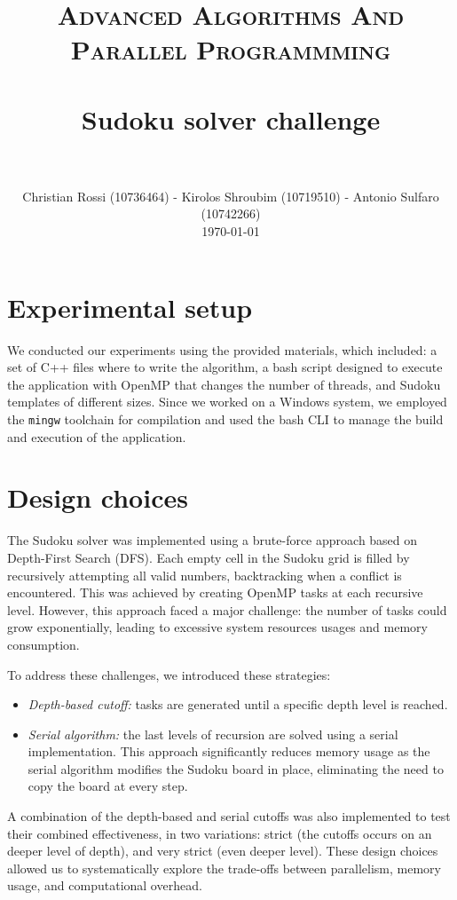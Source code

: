 \documentclass[paper=a4, fontsize=12pt]{scrartcl}
\title{
		\vspace{-1in} 	
		\usefont{OT1}{bch}{b}{n}
		\normalfont \normalsize \textsc{Advanced Algorithms And Parallel Programmming} \\ [25pt]
		\horrule{0.5pt} \\[0.4cm]
		\huge Sudoku solver challenge \\
		\horrule{2pt} \\[0.5cm]
}
\author{
		\normalfont 								\normalsize
        Christian Rossi (10736464) - Kirolos Shroubim (10719510) - Antonio Sulfaro (10742266)\\[-3pt]		\normalsize
        \today
}
\date{}
\numberwithin{equation}{section}
\numberwithin{figure}{section}
\numberwithin{table}{section}
\begin{document}
    \maketitle

    \section{Experimental setup}
    We conducted our experiments using the provided materials, which included: a set of C++ files where to write the algorithm, a bash script designed to execute the application with OpenMP that changes the number of threads, and Sudoku templates of different sizes. 
    Since we worked on a Windows system, we employed the \texttt{mingw} toolchain for compilation and used the bash CLI to manage the build and execution of the application.
    
    \section{Design choices}
    The Sudoku solver was implemented using a brute-force approach based on Depth-First Search (DFS). 
    Each empty cell in the Sudoku grid is filled by recursively attempting all valid numbers, backtracking when a conflict is encountered.
    This was achieved by creating OpenMP tasks at each recursive level. 
    However, this approach faced a major challenge: the number of tasks could grow exponentially, leading to excessive system resources usages and memory consumption.

    \noindent To address these challenges, we introduced these strategies:
    \begin{itemize}
        \item \textit{Depth-based cutoff:} tasks are generated until a specific depth level is reached. 
        \item \textit{Serial algorithm:} the last levels of recursion are solved using a serial implementation. 
            This approach significantly reduces memory usage as the serial algorithm modifies the Sudoku board in place, eliminating the need to copy the board at every step.
    \end{itemize}
    A combination of the depth-based and serial cutoffs was also implemented to test their combined effectiveness, in two variations: strict (the cutoffs occurs on an deeper level of depth), and very strict (even deeper level).
    These design choices allowed us to systematically explore the trade-offs between parallelism, memory usage, and computational overhead. 
\end{document}
